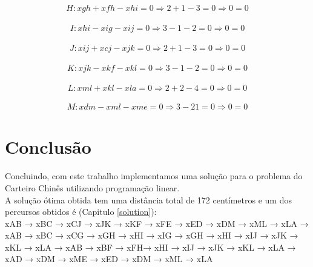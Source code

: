 \documentclass[a4paper]{report}
\begin{document}
\begin{multline}
H: xgh + xfh - xhi = 0
\Rightarrow 2 + 1 - 3 = 0
\Rightarrow 0 = 0
\end{multline}

\begin{multline}
I: xhi - xig - xij = 0
\Rightarrow 3 - 1 - 2 = 0
\Rightarrow 0 = 0
\end{multline}

\begin{multline}
J: xij + xcj - xjk = 0
\Rightarrow 2 + 1 - 3 = 0
\Rightarrow 0 = 0
\end{multline}

\begin{multline}
K: xjk - xkf - xkl = 0
\Rightarrow 3 - 1 - 2 = 0
\Rightarrow 0 = 0
\end{multline}

\begin{multline}
L: xml + xkl - xla = 0
\Rightarrow 2 + 2 - 4 = 0
\Rightarrow 0 = 0
\end{multline}

\begin{multline}
M: xdm - xml - xme = 0
\Rightarrow 3 - 2 1 = 0
\Rightarrow 0 = 0
\end{multline}

\chapter{Conclusão}
Concluindo, com este trabalho implementamos uma solução para o problema do
Carteiro Chinês utilizando programação linear.\\
A solução ótima obtida tem uma distância total de 172 centímetros e um dos
percursos obtidos é (Capitulo \ref{solution}):\\
xAB → xBC → xCJ → xJK → xKF → xFE → xED → xDM → xML → xLA →
xAB → xBC → xCG → xGH → xHI  → xIG → xGH → xHI → xIJ → xJK  → xKL  → xLA →
xAB → xBF → xFH→ xHI  → xIJ → xJK  → xKL  → xLA →
xAD → xDM → xME → xED  → xDM → xML → xLA\\
\end{document}
